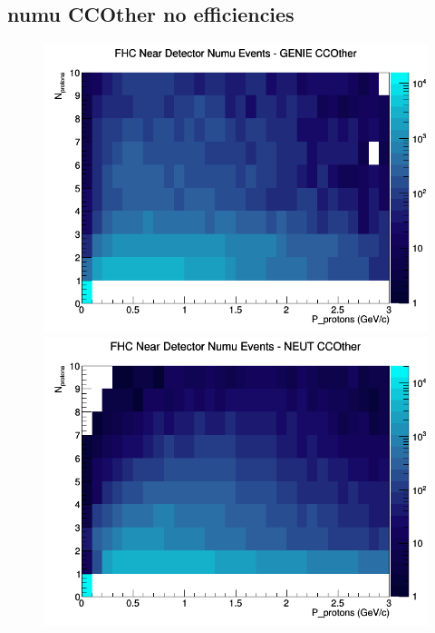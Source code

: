 \documentclass[12pt]{article}
\begin{document}
\subsection{numu CCOther no efficiencies}
\begin{figure}[h]
\includegraphics[width=\linewidth]{N_P/nominal/protons/CCOther_FHC_ND_numu_N_P_GENIE.png}
\endminipage
{}
\includegraphics[width=\linewidth]{N_P/nominal/protons/CCOther_FHC_ND_numu_N_P_NEUT.png}
\endminipage
{}

\end{figure}
\end{document}
